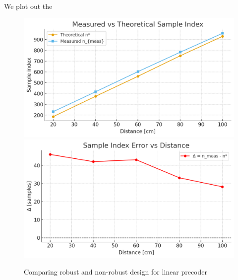 \documentclass[10pt]{article}
\begin{document}
We plot out the 
\begin{figure}[!h]
	\centering 
	 {
		\includegraphics[width = .45\columnwidth]{fig/distance_vs_sample_theo_meas.png}	
	}
	 {
		\includegraphics[width = .45\columnwidth]{fig/distance_vs_delta.png}
	}
	\caption{Comparing robust and non-robust design for linear precoder}
\label{fig:robust_lin}
\end{figure}




\end{document}
